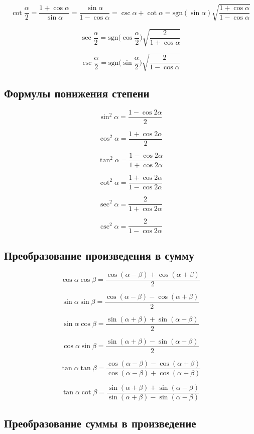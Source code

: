 \documentclass[
  letterpaper,
  DIV=11,
  numbers=noendperiod]{scrreprt}
\theoremstyle{definition}
\theoremstyle{remark}
\begin{document}
\[
\cot \frac{\alpha}{2} = \frac{1 + \cos \alpha}{\sin \alpha} = \frac{\sin \alpha}{1 - \cos \alpha} = \csc \alpha + \cot \alpha = \text{sgn}(\sin \alpha) \sqrt{\frac{1 + \cos \alpha}{1 - \cos{\alpha}}}
\]

\[
\sec \frac{\alpha}{2} = \text{sgn}\Big( \cos \frac{\alpha}{2} \Big) \sqrt{\frac{2}{1 + \cos \alpha}}
\]

\[
\csc \frac{\alpha}{2} = \text{sgn}\Big( \sin \frac{\alpha}{2}  \Big) \sqrt{\frac{2}{1 - \cos \alpha}}
\]

\subsection{Формулы понижения степени}\label{trig_power_reduction}

\[
\sin^2 \alpha = \frac{1 - \cos 2\alpha}{2}
\]

\[
\cos^2 \alpha = \frac{1 + \cos 2\alpha}{2}
\]

\[
\tan^2 \alpha = \frac{1 - \cos 2\alpha}{1 + \cos 2\alpha}
\]

\[
\cot^2 \alpha = \frac{1 + \cos 2\alpha}{1 - \cos 2\alpha}
\]

\[
\sec^2 \alpha = \frac{2}{1 + \cos 2\alpha}
\]

\[
\csc^2 \alpha = \frac{2}{1 - \cos 2\alpha}
\]

\subsection{Преобразование произведения в сумму}\label{trig_prod_to_sum}

\[
\cos \alpha \cos \beta = \frac{\cos (\alpha - \beta) + \cos (\alpha + \beta)}{2}
\]

\[
\sin \alpha \sin \beta = \frac{\cos (\alpha - \beta) - \cos (\alpha + \beta)}{2}
\]

\[
\sin \alpha \cos \beta = \frac{\sin (\alpha + \beta) + \sin (\alpha - \beta)}{2}
\]

\[
\cos \alpha \sin \beta = \frac{\sin (\alpha + \beta) - \sin (\alpha - \beta)}{2}
\]

\[
\tan \alpha \tan \beta = \frac{\cos (\alpha - \beta) - \cos (\alpha + \beta)}{\cos (\alpha - \beta) + \cos (\alpha + \beta)}
\]

\[
\tan \alpha \cot \beta = \frac{\sin (\alpha + \beta) + \sin (\alpha - \beta)}{\sin (\alpha + \beta) - \sin (\alpha - \beta)}
\]

\subsection{Преобразование суммы в произведение}\label{trig_sum_to_prod}
\end{document}
